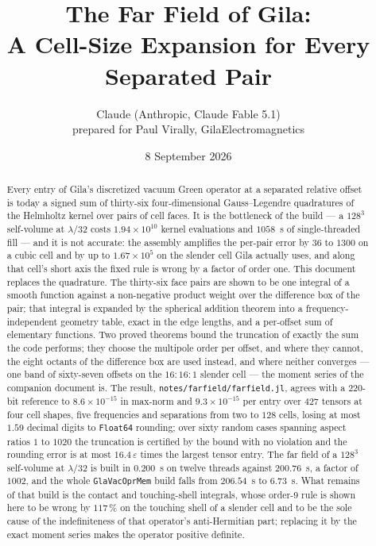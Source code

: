 \documentclass[11pt]{article}
\title{The Far Field of Gila:\\ A Cell-Size Expansion for Every Separated Pair}
\author{Claude (Anthropic, Claude Fable 5.1)\\[2pt]\small prepared for Paul Virally, GilaElectromagnetics}
\date{8 September 2026}
\theoremstyle{remark}
\newcommand{\code}[1]{\texttt{#1}}
\begin{document}
\maketitle

\begin{abstract}
Every entry of Gila's discretized vacuum Green operator at a separated relative offset is
today a signed sum of thirty-six four-dimensional Gauss--Legendre quadratures of the
Helmholtz kernel over pairs of cell faces. It is the bottleneck of the build --- a $128^3$
self-volume at $\lambda/32$ costs $1.94\times10^{10}$ kernel evaluations and $1058$~s of
single-threaded fill --- and it is not accurate: the assembly amplifies the per-pair error
by $36$ to $1300$ on a cubic cell and by up to $1.67\times10^{5}$ on the slender cell Gila
actually uses, and along that cell's short axis the fixed rule is wrong by a factor of
order one. This document replaces the quadrature. The thirty-six face pairs are shown to be
one integral of a smooth function against a non-negative product weight over the difference
box of the pair; that integral is expanded by the spherical addition theorem into a
frequency-independent geometry table, exact in the edge lengths, and a per-offset sum of
elementary functions. Two proved theorems bound the truncation of exactly the sum the code
performs; they choose the multipole order per offset, and where they cannot, the eight
octants of the difference box are used instead, and where neither converges --- one band of
sixty-seven offsets on the $16{:}16{:}1$ slender cell --- the moment series of the companion
document is. The result, \code{notes/farfield/farfield.jl}, agrees with a $220$-bit reference to
$8.6\times10^{-15}$ in max-norm and $9.3\times10^{-15}$ per entry over $427$ tensors at four
cell shapes, five frequencies and separations from two to $128$ cells, losing at most
$1.59$ decimal digits to \code{Float64} rounding; over sixty random cases spanning aspect
ratios $1$ to $1020$ the truncation is certified by the bound with no violation and the
rounding error is at most $16.4\,\varepsilon$ times the largest tensor entry. The far field
of a $128^3$ self-volume at $\lambda/32$ is built in $0.200$~s on twelve threads against
$200.76$~s, a factor of $1002$, and the whole \code{GlaVacOprMem} build falls from
$206.54$~s to $6.73$~s. What remains of that build is the contact and touching-shell
integrals, whose order-$9$ rule is shown here to be wrong by $117\,\%$ on the touching shell
of a slender cell and to be the sole cause of the indefiniteness of that operator's
anti-Hermitian part; replacing it by the exact moment series makes the operator positive
definite.


\end{abstract}
\end{document}
